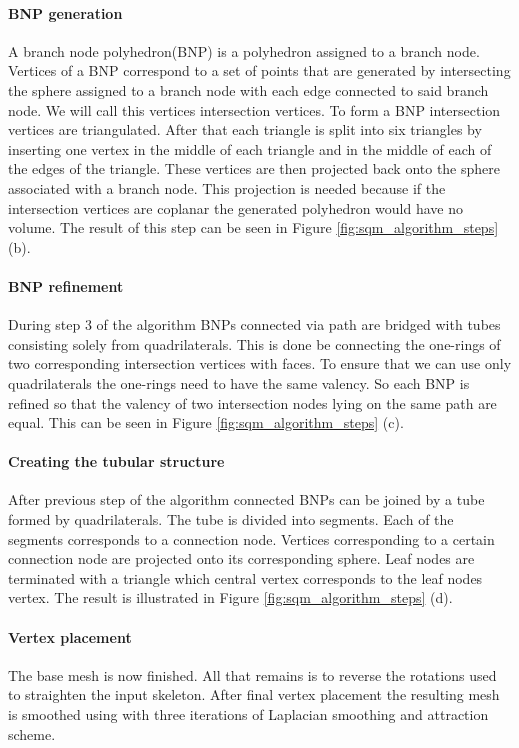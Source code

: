 \paragraph{BNP generation}
A branch node polyhedron(BNP) is a polyhedron assigned to a branch node. Vertices of a BNP correspond to a set of points that are generated by intersecting the sphere assigned to a branch node with each edge connected to said branch node. We will call this vertices intersection vertices. To form a BNP intersection vertices are triangulated. After that each triangle is split into six triangles by inserting one vertex in the middle of each triangle and in the middle of each of the edges of the triangle. These vertices are then projected back onto the sphere associated with a branch node. This projection is needed because if the intersection vertices are coplanar the generated polyhedron would have no volume. The result of this step can be seen in Figure \ref{fig:sqm_algorithm_steps} (b).

\paragraph{BNP refinement}
During step 3 of the algorithm BNPs connected via path are bridged with tubes consisting solely from quadrilaterals. This is done be connecting the one-rings of two corresponding intersection vertices with faces. To ensure that we can use only quadrilaterals the one-rings need to have the same valency. So each BNP is refined so that the valency of two intersection nodes lying on the same path are equal. This can be seen in Figure \ref{fig:sqm_algorithm_steps} (c).

\paragraph{Creating the tubular structure}
After previous step of the algorithm connected BNPs can be joined by a tube formed by quadrilaterals. The tube is divided into segments. Each of the segments corresponds to a connection node. Vertices corresponding to a certain connection node are projected onto its corresponding sphere. Leaf nodes are terminated with a triangle which central vertex corresponds to the leaf nodes vertex. The result is illustrated in Figure \ref{fig:sqm_algorithm_steps} (d).

\paragraph{Vertex placement}
The base mesh is now finished. All that remains is to reverse the rotations used to straighten the input skeleton. After final vertex placement the resulting mesh is smoothed using with three iterations of Laplacian smoothing and attraction scheme.

